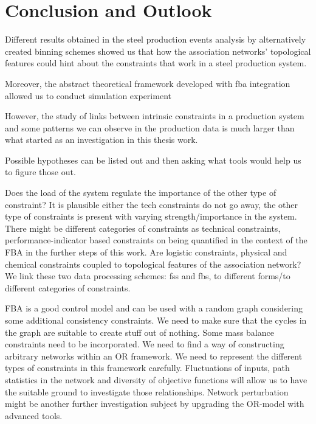 \chapter{Conclusion and Outlook}

Different results obtained in the steel production events analysis by alternatively created binning schemes showed us that how the association networks' topological features could hint about the constraints that work in a steel production system.

Moreover, the abstract theoretical framework developed with \acf{fba} integration allowed us to conduct simulation experiment



However, the study of links between intrinsic constraints in a production system and some patterns we can observe in the production data is much larger than what started as an investigation in this thesis work.

Possible hypotheses can be listed out and then asking what tools would help us to figure those out.

Does the load of the system regulate the importance of the other type of constraint? It is plausible either the tech constraints do not go away, the other type of constraints is present with varying strength/importance in the system.
There might be different categories of constraints as technical constraints, performance-indicator based constraints on being quantified in the context of the FBA in the further steps of this work.
Are logistic constraints, physical and chemical constraints coupled to topological features of the association network?
We link these two data processing schemes: \acs{fss} and \acs{fbs}, to different forms/to different categories of constraints.

FBA is a good control model and can be used with a random graph considering some additional consistency constraints. We need to make sure that the cycles in the graph are suitable to create stuff out of nothing. Some mass balance constraints need to be incorporated. We need to find a way of constructing arbitrary networks within an OR framework. We need to represent the different types of constraints in this framework carefully. Fluctuations of inputs, path statistics in the network and diversity of objective functions will allow us to have the suitable ground to investigate those relationships.
Network perturbation might be another further investigation subject by upgrading the OR-model with advanced tools.


